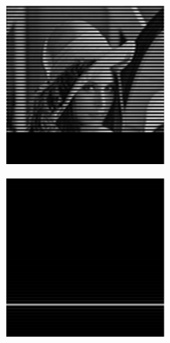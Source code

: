 \begin{figure}[h]
\begin{subfigure}[t]{0.23\textwidth}
      \caption{}
  \end{subfigure}\hfill
  \begin{subfigure}[t]{0.23\textwidth}
      \centering
      \includegraphics[width=\textwidth]{sim_slit/1/sim_vert_frame}
      \caption{}
  \end{subfigure}\hfill
  \begin{subfigure}[t]{0.23\textwidth}
      \centering
      \includegraphics[width=\textwidth]{sim_slit/1/sim_slit_pattern}

\end{subfigure}
\end{figure}
